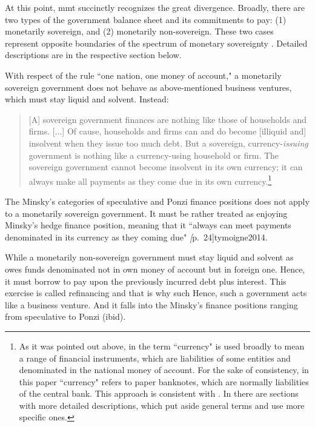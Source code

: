 At this point, \ac{mmt} succinctly recognizes the great divergence. Broadly,
there are two types of the government balance sheet and its commitments
to pay: (1) monetarily sovereign, and (2) monetarily non-sovereign.
These two cases represent opposite boundaries of the spectrum of
monetary sovereignty \cite{fadhel}. Detailed descriptions are in the
respective section below.

With respect of the rule ``one nation, one money of account," a
monetarily sovereign government does not behave as above-mentioned
business ventures, which must stay liquid and solvent. Instead:

\begin{quote}
[A] sovereign government finances are nothing like those of households
and firms. [...] Of cause, households and firms can and do become
[illiquid and] insolvent when they issue too much debt. But a
sovereign, currency-\textit{issuing} government is nothing like a
currency-using household or firm. The sovereign government cannot
become insolvent in its own currency; it can always make all payments
as they come due in its own currency.\footnote{As it was pointed out above, in \cite{wray2012,wray_2020,wray2022_2} the term ``currency" is used broadly to mean a range of
    financial instruments, which are liabilities of some entities and
    denominated in the national money of account. For the sake of
    consistency, in this paper ``currency" refers to paper banknotes,
    which are normally liabilities of the central bank. This approach is
    consistent with \citep[p.~32]{tymoigne_textbook}. In \citep{wray2012,wray_2020,wray2022_2} there are sections with more detailed descriptions, which put aside general terms and use more specific ones.}~\citep[p.~2, emphasis original]{wray2022_2}
\end{quote}

The Minsky's categories of speculative and Ponzi finance positions does
not apply to a monetarily sovereign government. It must be rather
treated as enjoying Minsky's hedge finance position, meaning that it
``always can meet payments denominated in its currency as they coming
due" \textit[p.~24]{tymoigne2014}.

While a monetarily non-sovereign government must stay liquid and solvent
as owes funds denominated not in own money of account but in
foreign one. Hence, it must borrow to pay upon the previously incurred
debt plus interest. This exercise is called refinancing and that is why
such Hence, such a government acts like a business venture. And it falls
into the Minsky's finance positions ranging from speculative to Ponzi
(ibid).

